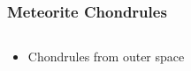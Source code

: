 \documentclass[aspectratio=169]{beamer}
\begin{document}
\begin{frame}
	\frametitle{Meteorite Chondrules}
	\begin{columns}
		\begin{column}{0.495\linewidth}
			\begin{itemize}
				\item Chondrules from outer space
			\end{itemize}
		\end{column}
		\begin{column}{0.495\linewidth}
%
		\end{column}
	\end{columns}
\end{frame}
\end{document}
